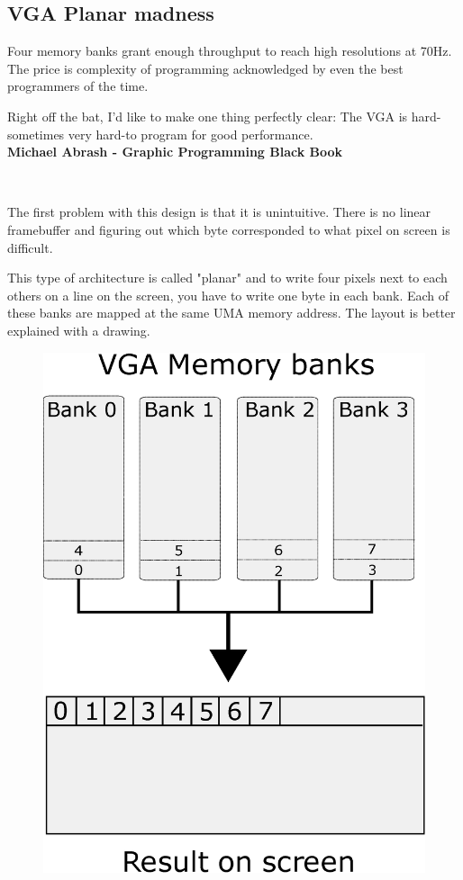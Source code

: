 \documentclass[book.tex]{subfiles}
\begin{document}
\subsection{VGA Planar madness}

Four memory banks grant enough throughput to reach high resolutions at 70Hz. The price is complexity of programming acknowledged by even the best programmers of the time.\\

 \begin{fancyquotes}
   Right off the bat, I'd like to make one thing perfectly clear: The VGA is hard-sometimes very hard-to program for good performance.
 \bigskip \\
\textbf{Michael Abrash - Graphic Programming Black Book}
 \end{fancyquotes}
 \\
\par
The first problem with this design is that it is unintuitive. There is no linear framebuffer and figuring out which byte corresponded to what pixel on screen is difficult.\\
\par
 This type of architecture is called "planar" and to write four pixels next to each others on a line on the screen, you have to write one byte in each bank. Each of these banks are mapped at the same UMA memory address. The layout is better explained with a drawing.\\
\par
\begin{figure}[H]
\centering
\includegraphics[width=.6\textwidth]{imgs/drawings/vga_ram_screen_layout.eps}
\label{fig:vga_arch}
\end{figure}
\end{document}
